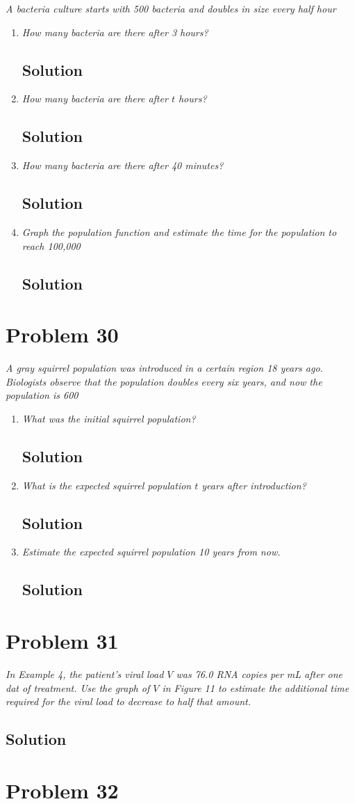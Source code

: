 \documentclass[11pt]{article}
\newcommand{\soln}{\subsection*}
\newcommand{\qn}{\textit}
\begin{document}
\qn{A bacteria culture starts with 500 bacteria and doubles in size every half hour}

\begin{enumerate}
	\item \qn{How many bacteria are there after 3 hours?}
	\soln{Solution}
	
	\item \qn{How many bacteria are there after $t$ hours?}
	\soln{Solution}
	
	\item \qn{How many bacteria are there after 40 minutes?}
	\soln{Solution}
	
	\item \qn{Graph the population function and estimate the time for the population to reach 100,000}
	\soln{Solution}
\end{enumerate}

\section*{Problem 30}

\qn{A gray squirrel population was introduced in a certain region 18 years ago. Biologists observe that the population doubles every six years, and now the population is 600}

\begin{enumerate}
	\item \qn{What was the initial squirrel population?}
	\soln{Solution}
	
	\item \qn{What is the expected squirrel population $t$ years after introduction?}
	\soln{Solution}
	
	\item \qn{Estimate the expected squirrel population 10 years from now.}
	\soln{Solution}
\end{enumerate}

\section*{Problem 31}

\qn{In Example 4, the patient's viral load $V$ was 76.0 RNA copies per mL after one dat of treatment. Use the graph of $V$ in Figure 11 to estimate the additional time required for the viral load to decrease to half that amount.}

\soln{Solution}

\section*{Problem 32}
\end{document}
